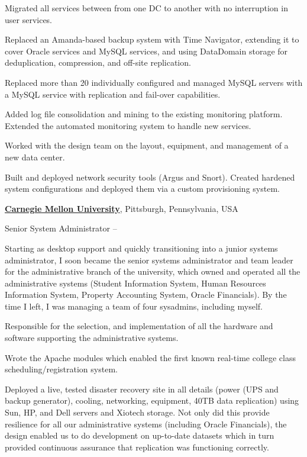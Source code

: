 \documentclass[letterpaper,10pt,oneside]{article}
\begin{document}
\begin{body}
\begin{detail}
\BulletItem Migrated all services between from one DC to another with no
interruption in user services.

\BulletItem Replaced an Amanda-based backup system with Time Navigator,
extending it to cover Oracle services and MySQL services, and using
DataDomain storage for deduplication, compression, and off-site
replication.

\BulletItem Replaced more than 20 individually configured and managed MySQL
servers with a MySQL service with replication and fail-over capabilities.

\BulletItem Added log file consolidation and mining to the existing
monitoring platform. Extended the automated monitoring system to handle new
services.

\BulletItem Worked with the design team on the layout, equipment, and
management of a new data center.

\BulletItem Built and deployed network security tools (Argus and
Snort).  Created hardened system configurations and deployed them via a
custom provisioning system.

\end{detail}
\EntryGap

\href{http://www.cmu.edu/}
{\textbf{Carnegie Mellon University}},
Pittsburgh, Pennsylvania, USA
\par
Senior System Administrator
\hfill
{} -- 

\begin{detail}

Starting as desktop support and quickly transitioning into a junior systems
administrator, I soon became the senior systems administrator and team
leader for the administrative branch of the university, which owned and
operated all the administrative systems (Student Information System, Human
Resources Information System, Property Accounting System, Oracle
Financials).  By the time I left, I was managing a team of four sysadmins,
including myself.

\BulletItem Responsible for the selection, and implementation of all the
hardware and software supporting the administrative systems.

\BulletItem Wrote the Apache modules which enabled the first known
real-time college class scheduling/registration system.

\BulletItem Deployed a live, tested disaster recovery site in all details
(power (UPS and backup generator), cooling, networking, equipment, 40TB
data replication) using Sun, HP, and Dell servers and Xiotech storage.  Not
only did this provide resilience for all our administrative systems
(including Oracle Financials), the design enabled us to do development on
up-to-date datasets which in turn provided continuous assurance that
replication was functioning correctly.


\end{detail}
\end{body}
\end{document}
